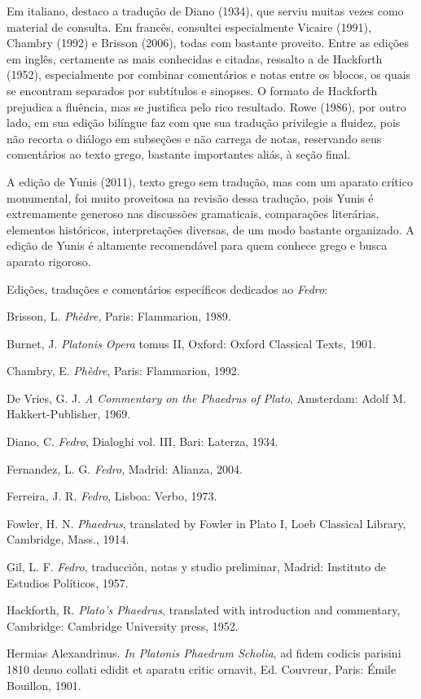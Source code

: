 Em italiano, destaco a tradução de Diano (1934), que serviu muitas vezes
como material de consulta. Em francês, consultei especialmente Vicaire
(1991), Chambry (1992) e Brisson (2006), todas com bastante proveito.
Entre as edições em inglês, certamente as mais conhecidas e citadas,
ressalto a de Hackforth (1952), especialmente por combinar comentários e
notas entre os blocos, os quais se encontram separados por subtítulos e
sinopses. O formato de Hackforth prejudica a fluência, mas se justifica
pelo rico resultado. Rowe (1986), por outro lado, em sua edição bilíngue
faz com que sua tradução privilegie a fluidez, pois não recorta o
diálogo em subseções e não carrega de notas, reservando seus comentários
ao texto grego, bastante importantes aliás, à seção final.

A edição de Yunis (2011), texto grego sem tradução, mas com um aparato
crítico monumental, foi muito proveitosa na revisão dessa tradução, pois
Yunis é extremamente generoso nas discussões gramaticais, comparações
literárias, elementos históricos, interpretações diversas, de um modo
bastante organizado. A edição de Yunis é altamente recomendável para
quem conhece grego e busca aparato rigoroso.

Edições, traduções e comentários específicos dedicados ao \emph{Fedro}:

Brisson, L. \emph{Phèdre,} Paris: Flammarion, 1989.

Burnet, J. \emph{Platonis Opera} tomus II, Oxford: Oxford Classical
Texts, 1901.

Chambry, E. \emph{Phèdre}, Paris: Flammarion, 1992.

De Vries, G. J. \emph{A Commentary on the Phaedrus of Plato}, Amsterdam:
Adolf M. Hakkert-Publisher, 1969.

Diano, C. \emph{Fedro}, Dialoghi vol. III, Bari: Laterza, 1934.

Fernandez, L. G. \emph{Fedro}, Madrid: Alianza, 2004.

Ferreira, J. R. \emph{Fedro}, Lisboa: Verbo, 1973.

Fowler, H. N. \emph{Phaedrus}, translated by Fowler in Plato I, Loeb
Classical Library, Cambridge, Mass., 1914.

Gil, L. F. \emph{Fedro}, traducción, notas y studio preliminar, Madrid:
Instituto de Estudios Políticos, 1957.

Hackforth, R. \emph{Plato's Phaedrus}, translated with introduction and
commentary, Cambridge: Cambridge University press, 1952.

Hermias Alexandrinus. \emph{In Platonis Phaedrum Scholia}, ad fidem
codicis parisini 1810 denuo collati edidit et aparatu critic ornavit,
Ed. Couvreur, Paris: Émile Bouillon, 1901.

